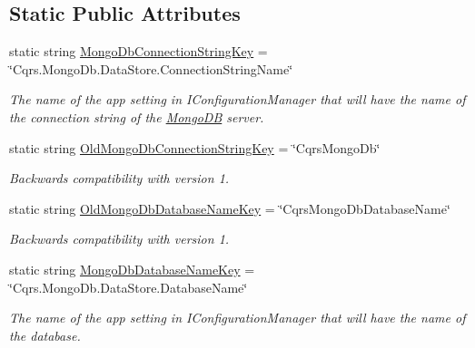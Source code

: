 \subsection*{Static Public Attributes}
\begin{DoxyCompactItemize}
\item 
static string \hyperlink{classCqrs_1_1Mongo_1_1Factories_1_1MongoDataStoreConnectionStringFactory_a3740f3d23c33cc85377d4c9073f61c97_a3740f3d23c33cc85377d4c9073f61c97}{Mongo\+Db\+Connection\+String\+Key} = \char`\"{}Cqrs.\+Mongo\+Db.\+Data\+Store.\+Connection\+String\+Name\char`\"{}
\begin{DoxyCompactList}\small\item\em The name of the app setting in I\+Configuration\+Manager that will have the name of the connection string of the \hyperlink{namespaceCqrs_1_1MongoDB}{Mongo\+DB} server. \end{DoxyCompactList}\item 
static string \hyperlink{classCqrs_1_1Mongo_1_1Factories_1_1MongoDataStoreConnectionStringFactory_a345dadeafc614f93f0c5fdbf59684334_a345dadeafc614f93f0c5fdbf59684334}{Old\+Mongo\+Db\+Connection\+String\+Key} = \char`\"{}Cqrs\+Mongo\+Db\char`\"{}
\begin{DoxyCompactList}\small\item\em Backwards compatibility with version 1. \end{DoxyCompactList}\item 
static string \hyperlink{classCqrs_1_1Mongo_1_1Factories_1_1MongoDataStoreConnectionStringFactory_a7f475a5348f6efc64d595527dd27c246_a7f475a5348f6efc64d595527dd27c246}{Old\+Mongo\+Db\+Database\+Name\+Key} = \char`\"{}Cqrs\+Mongo\+Db\+Database\+Name\char`\"{}
\begin{DoxyCompactList}\small\item\em Backwards compatibility with version 1. \end{DoxyCompactList}\item 
static string \hyperlink{classCqrs_1_1Mongo_1_1Factories_1_1MongoDataStoreConnectionStringFactory_afeca0c0e92ca9d9c83f15b2b03f769a8_afeca0c0e92ca9d9c83f15b2b03f769a8}{Mongo\+Db\+Database\+Name\+Key} = \char`\"{}Cqrs.\+Mongo\+Db.\+Data\+Store.\+Database\+Name\char`\"{}
\begin{DoxyCompactList}\small\item\em The name of the app setting in I\+Configuration\+Manager that will have the name of the database. \end{DoxyCompactList}\end{DoxyCompactItemize}
